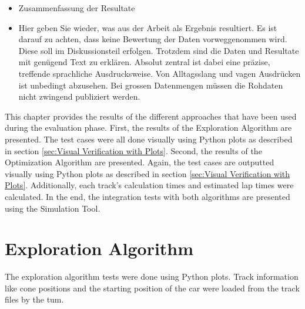 \begin{itemize}
    \item Zusammenfassung der Resultate
    \item Hier geben Sie wieder, was aus der Arbeit als Ergebnis resultiert. Es ist darauf zu achten, dass keine Bewertung der Daten vorweggenommen wird. Diese soll im Diskussionsteil erfolgen. Trotzdem sind die Daten und Resultate mit genügend Text zu erklären. Absolut zentral ist dabei eine präzise, treffende sprachliche Ausdrucksweise. Von Alltagsslang und vagen Ausdrücken ist unbedingt abzusehen.
          Bei grossen Datenmengen müssen die Rohdaten nicht zwingend publiziert werden.
\end{itemize}

This chapter provides the results of the different approaches that have been used during the evaluation phase. First, the results of the Exploration Algorithm are presented. The test cases were all done visually using Python plots as described in section \ref{sec:Visual Verification with Plots}. Second, the results of the Optimization Algorithm are presented. Again, the test cases are outputted visually using Python plots as described in section \ref{sec:Visual Verification with Plots}. Additionally, each track's calculation times and estimated lap times were calculated. In the end, the integration tests with both algorithms are presented using the Simulation Tool.

\section{Exploration Algorithm}
The exploration algorithm tests were done using Python plots. Track information like cone positions and the starting position of the car were loaded from the track files by the \acrlong{tum}. \cite{tumftm_optimization_algoritm}

